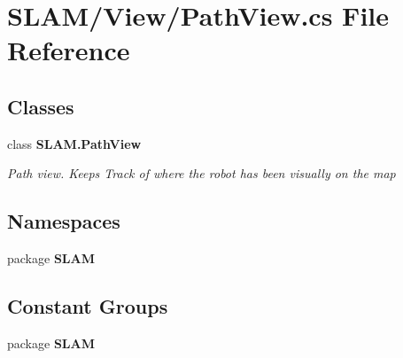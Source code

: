 \section{S\-L\-A\-M/\-View/\-Path\-View.cs File Reference}
\label{_path_view_8cs}
\subsection*{Classes}
\begin{DoxyCompactItemize}
\item 
class {\bf S\-L\-A\-M.\-Path\-View}
\begin{DoxyCompactList}\small\item\em Path view. Keeps Track of where the robot has been visually on the map \end{DoxyCompactList}\end{DoxyCompactItemize}
\subsection*{Namespaces}
\begin{DoxyCompactItemize}
\item 
package {\bf S\-L\-A\-M}
\end{DoxyCompactItemize}
\subsection*{Constant Groups}
\begin{DoxyCompactItemize}
\item 
package {\bf S\-L\-A\-M}
\end{DoxyCompactItemize}

